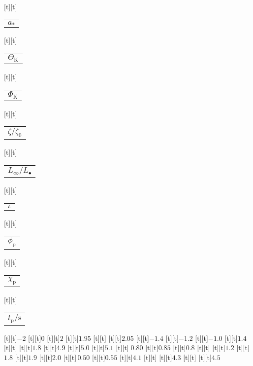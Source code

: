 \begin{psfrags}
[t][t]{\color[rgb]{0,0,0}\setlength{\tabcolsep}{0pt}\begin{tabular}{c}{$a_\ast$}\end{tabular}}%
[t][t]{\color[rgb]{0,0,0}\setlength{\tabcolsep}{0pt}\begin{tabular}{c}{$\Theta_\mathrm{K}$}\end{tabular}}%
[t][t]{\color[rgb]{0,0,0}\setlength{\tabcolsep}{0pt}\begin{tabular}{c}{$\Phi_\mathrm{K}$}\end{tabular}}%
[t][t]{\color[rgb]{0,0,0}\setlength{\tabcolsep}{0pt}\begin{tabular}{c}{$\zeta/\zeta_0$}\end{tabular}}%
[t][t]{\color[rgb]{0,0,0}\setlength{\tabcolsep}{0pt}\begin{tabular}{c}{$L_\infty/L_\bullet$}\end{tabular}}%
[t][t]{\color[rgb]{0,0,0}\setlength{\tabcolsep}{0pt}\begin{tabular}{c}{$\iota$}\end{tabular}}%
[t][t]{\color[rgb]{0,0,0}\setlength{\tabcolsep}{0pt}\begin{tabular}{c}{$\phi_\mathrm{p}$}\end{tabular}}%
[t][t]{\color[rgb]{0,0,0}\setlength{\tabcolsep}{0pt}\begin{tabular}{c}{$\chi_\mathrm{p}$}\end{tabular}}%
[t][t]{\color[rgb]{0,0,0}\setlength{\tabcolsep}{0pt}\begin{tabular}{c}{$t_\mathrm{p}/\mathrm{s}$}\end{tabular}}%
%
[t][t]{$-2$}%
[t][t]{$0$}%
[t][t]{$2$}%
[t][t]{$1.95$}%
[t][t]{}%
[t][t]{$2.05$}%
[t][t]{$-1.4$}%
[t][t]{$-1.2$}%
[t][t]{$-1.0$}%
[t][t]{$1.4$}%
[t][t]{}%
[t][t]{$1.8$}%
[t][t]{$4.9$}%
[t][t]{$5.0$}%
[t][t]{$5.1$}%
[t][t]{$\;0.80$}%
[t][t]{$0.85$}%
[t][t]{$0.8$}%
[t][t]{}%
[t][t]{$1.2$}%
[t][t]{$1.8$}%
[t][t]{$1.9$}%
[t][t]{$2.0$}%
[t][t]{$\,0.50$}%
[t][t]{$0.55$}%
[t][t]{$4.1$}%
[t][t]{}%
[t][t]{$4.3$}%
[t][t]{}%
[t][t]{$4.5$}%

\end{psfrags}
